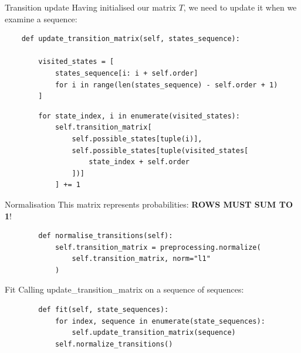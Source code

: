 \documentclass[10pt]{beamer}
\begin{document}
	\begin{frame}[fragile]{Transition update}
	Having initialised our matrix $T$, we need to update it when we examine a sequence:
	\pause
	\begin{verbatim}
	def update_transition_matrix(self, states_sequence):

		visited_states = [
			states_sequence[i: i + self.order]
			for i in range(len(states_sequence) - self.order + 1)
		]
	\end{verbatim}
	\pause
	\begin{verbatim}
		for state_index, i in enumerate(visited_states):
			self.transition_matrix[
				self.possible_states[tuple(i)],
				self.possible_states[tuple(visited_states[
					state_index + self.order
				])]
			] += 1
	\end{verbatim}

	\end{frame}
	
	\begin{frame}
	\end{frame}
	
	\begin{frame}[fragile]{Normalisation}
	This matrix represents probabilities: \textbf{ROWS MUST SUM TO 1}!
	\pause
	\vspace{0.5cm}
	\begin{verbatim}
		def normalise_transitions(self):
			self.transition_matrix = preprocessing.normalize(
				self.transition_matrix, norm="l1"
			)
	\end{verbatim}
	

	\end{frame}
	
	\begin{frame}[fragile]{Fit}
	Calling update\_transition\_matrix on a sequence of sequences:
	\pause
	\vspace{0.5cm}
	\begin{verbatim}
		def fit(self, state_sequences):
			for index, sequence in enumerate(state_sequences):
				self.update_transition_matrix(sequence)
			self.normalize_transitions()
	\end{verbatim}

	\end{frame}
	
\end{document}
